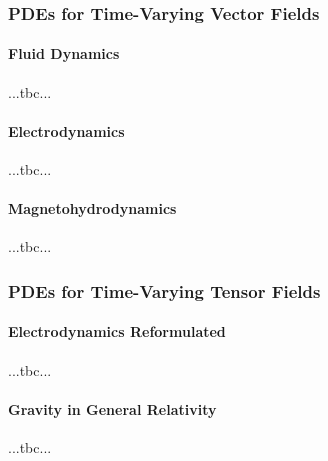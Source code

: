 

% 





\subsubsection{PDEs for Time-Varying Vector Fields}

\paragraph{Fluid Dynamics} ...tbc...



\paragraph{Electrodynamics} ...tbc...

\paragraph{Magnetohydrodynamics} ...tbc...




\subsubsection{PDEs for Time-Varying Tensor Fields}

\paragraph{Electrodynamics Reformulated} ...tbc...

\paragraph{Gravity in General Relativity} ...tbc...




